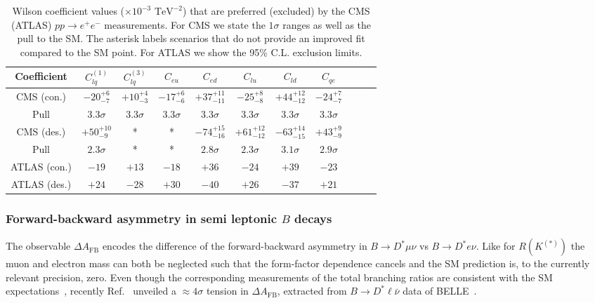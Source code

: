 \documentclass[10pt]{article}
\begin{document}
\begin{center}
	\begin{table}
		\centering
		\begin{tabular}{c|cccccccccc}
			Coefficient & $C_{lq}^{(1)}$ & $C_{lq}^{(3)}$ & $C_{eu}$ & $C_{ed}$ & $C_{lu}$ & $C_{ld}$ & $C_{qe}$\\
			\hline
			CMS (con.) & $-20^{+6}_{-7}$ & $+10^{+4}_{-3}$ & $-17^{+6}_{-6}$ & $+37^{+11}_{-11}$ & $-25^{+8}_{-8}$ & $+44^{+12}_{-12}$ & $-24^{+7}_{-7}$\\
			Pull & $3.3 \sigma$ & $3.3 \sigma$ & $3.3 \sigma$ & $3.3 \sigma$ & $3.3 \sigma$ & $3.3 \sigma$ & $3.3 \sigma$ \\
			CMS (des.) & $+50^{+10}_{-9}$ & * & * & $-74^{+15}_{-16}$ & $+61^{+12}_{-12}$ & $-63^{+14}_{-15}$ & $+43^{+9}_{-9}$ \\
			Pull & $2.3 \sigma$ & * & * & $2.8 \sigma$ & $2.3 \sigma$ & $3.1 \sigma$ & $2.9 \sigma$\\
			ATLAS (con.)& $-19$ & $+13$ & $-18$ & $+36$ & $-24$ & $+39$ & $-23$\\
			ATLAS (des.)& $+24$ & $-28$ & $+30$ & $-40$ & $+26$ & $-37$ & $+21$\\
		\end{tabular}
		\caption{Wilson coefficient values ($\times 10^{-3} \text{ TeV}^{-2}$) that are preferred (excluded) by the CMS (ATLAS) $pp \to e^+e^-$ measurements. For CMS we state the $1\sigma$ ranges as well as the pull to the SM. The asterisk labels scenarios that do not provide an improved fit compared to the SM point. For ATLAS we show the 95\% C.L. exclusion limits. }
		\label{tab:2q2lExplanationstoDY}
	\end{table}
\end{center}

\subsubsection[Forward-backward asymmetry in semi leptonic $B$ decays]{\boldmath Forward-backward asymmetry in semi leptonic $B$ decays} 
\label{sec:deltaAFB}
%
The observable $\Delta A_{\mathrm{FB}}$ encodes the difference of the forward-backward asymmetry in $B\to D^*\mu\nu$ vs $B\to D^*e\nu$. Like for $R(K^{(*)})$ the muon and electron mass can both be neglected such that the form-factor dependence cancels and the SM prediction is, to the currently relevant precision, zero. Even though the corresponding measurements of the total branching ratios are consistent with the SM expectations~\cite{Belle:2015pkj,Belle:2017rcc}, recently Ref.~\cite{Bobeth:2021lya} unveiled a $\approx\!4\sigma$ tension in $\Delta A_{\mathrm{FB}}$, extracted from $B\to D^*\ell\bar \nu$ data of BELLE~\cite{Belle:2018ezy}.
\end{document}

